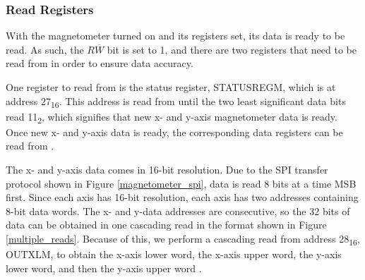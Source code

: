 \subsubsection{Read Registers}
With the magnetometer turned on and its registers set, its data is ready to be read. As such, the $R\overline{W}$ bit is set to 1, and there are two registers that need to be read from in order to ensure data accuracy. 
\par
One register to read from is the status register, STATUS\textunderscore{}REG\textunderscore{}M, which is at address 27\textsubscript{16}. This address is read from until the two least significant data bits read 11\textsubscript{2}, which signifies that new x- and y-axis magnetometer data is ready. Once new x- and y-axis data is ready, the corresponding data registers can be read from \cite{lsm9ds1}.
\par
The x- and y-axis data comes in 16-bit resolution. Due to the SPI transfer protocol shown in Figure \ref{magnetometer_spi}, data is read 8 bits at a time MSB first. Since each axis has 16-bit resolution, each axis has two addresses containing 8-bit data words. The x- and y-data addresses are consecutive, so the 32 bits of data can be obtained in one cascading read in the format shown in Figure \ref{multiple_reads}. Because of this, we perform a cascading read from address 28\textsubscript{16}, OUT\textunderscore{}X\textunderscore{}L\textunderscore{}M, to obtain the x-axis lower word, the x-axis upper word, the y-axis lower word, and then the y-axis upper word \cite{lsm9ds1}.







